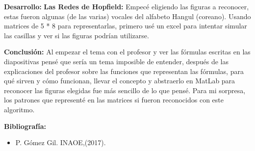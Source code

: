 \documentclass{article}
\begin{document}
\newpage
\maketitle
\textsf{\textbf{Desarrollo:}}
\textbf{Las Redes de Hopfield:}
Empecé eligiendo las figuras a reconocer, estas fueron algunas (de las varias) vocales del alfabeto Hangul (coreano). Usando matrices de 5 * 8 para representarlas, primero usé un excel para intentar simular las casillas y ver si las figuras podrían utilizarse.




\textbf{Conclusión:}
Al empezar el tema con el profesor y ver las fórmulas escritas en las diapositivas pensé que sería un tema imposible de entender, después de las explicaciones del profesor sobre las funciones que representan las fórmulas, para qué sirven y cómo funcionan, llevar el concepto y abstraerlo en MatLab para reconocer las figuras elegidas fue más sencillo de lo que pensé.
Para mi sorpresa, los patrones que representé en las matrices si fueron reconocidos con este algoritmo.


\textbf{Bibliografía:}
\begin{itemize}
    \item P. Gómez Gil. INAOE,(2017).
\end{itemize}
\end{document}
